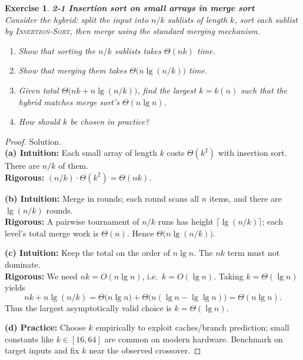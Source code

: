 \documentclass[12pt]{article}
\newtheorem{exercise}[theorem]{Exercise}
\theoremstyle{definition}
\begin{document}
\begin{exercise}
\noindent
\textbf{2-1 Insertion sort on small arrays in merge sort}\\
\noindent
Consider the hybrid: split the input into $n/k$ sublists of length $k$, sort each sublist by
\textsc{Insertion-Sort}, then merge using the standard merging mechanism.
\begin{enumerate}\itemsep0.25em
\item[(a)] Show that sorting the $n/k$ sublists takes $\Theta(nk)$ time.
\item[(b)] Show that merging them takes $\Theta\!\big(n\lg (n/k)\big)$ time.
\item[(c)] Given total $\Theta\!\big(nk+n\lg (n/k)\big)$, find the largest $k=k(n)$ such that the hybrid matches merge sort’s $\Theta(n\lg n)$.
\item[(d)] How should $k$ be chosen in practice?
\end{enumerate}
\end{exercise}

\vspace{1pt}

\begin{proof}
Solution.\\

\noindent
\textbf{(a) Intuition:} Each small array of length $k$ costs $\Theta(k^2)$ with insertion sort. There are $n/k$ of them.\\
\textbf{Rigorous:} $(n/k)\cdot\Theta(k^2)=\Theta(nk)$.

\smallskip
\noindent
\textbf{(b) Intuition:} Merge in rounds; each round scans all $n$ items, and there are $\lg(n/k)$ rounds.\\
\textbf{Rigorous:} A pairwise tournament of $n/k$ runs has height $\lceil\lg(n/k)\rceil$; each level’s total
merge work is $\Theta(n)$. Hence $\Theta\!\big(n\lg(n/k)\big)$.

\smallskip
\noindent
\textbf{(c) Intuition:} Keep the total on the order of $n\lg n$. The $nk$ term must not dominate.\\
\textbf{Rigorous:} We need $nk=O(n\lg n)$, i.e.\ $k=O(\lg n)$. Taking $k=\Theta(\lg n)$ yields
\[
nk+n\lg(n/k)=\Theta\big(n\lg n\big)+\Theta\!\big(n(\lg n-\lg\lg n)\big)=\Theta(n\lg n).
\]
Thus the largest asymptotically valid choice is $k=\Theta(\lg n)$.

\smallskip
\noindent
\textbf{(d) Practice:} Choose $k$ empirically to exploit caches/branch prediction; small constants like
$k\in[16,64]$ are common on modern hardware. Benchmark on target inputs and fix $k$ near the observed crossover.
\end{proof}
\end{document}
